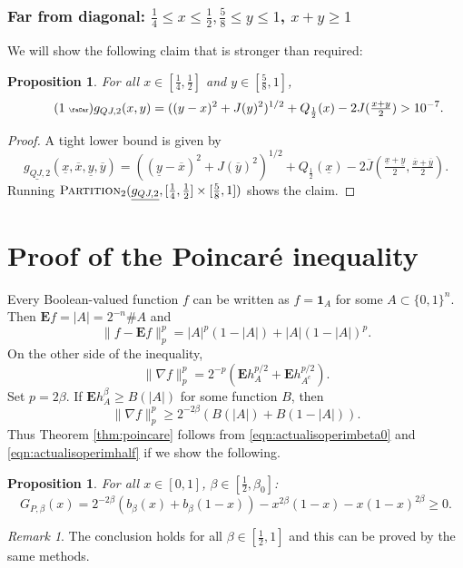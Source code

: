 \documentclass[12pt]{amsart}
\theoremstyle{plain}
\newtheorem{prop}[thm]{Proposition}
\newcommand{\auto}{\tag{\addtocounter{equation}{1}\theequation\;{\tiny\faCar}}}
\theoremstyle{definition}
\theoremstyle{remark}
\newtheorem{rem}[thm]{Remark}
\numberwithin{equation}{section}
\begin{document}
\subsubsection{Far from diagonal: $\tfrac14\leq x\leq \tfrac12, \frac58\leq y\le 1$, $x+y\ge 1$}
\label{sec:QJ-II}
We will show the following claim that is stronger than required:
\begin{prop}
For all $x\in [\frac14, \frac12]$ and $y\in[\frac58,1]$,
\begin{equation}\label{eqn:g_QJ_2_auto}\auto
g_{QJ,2}(x,y)= ((y-x)^2 +J(y)^2)^{1/2}+Q_{\frac12}(x)-2J(\tfrac{x+y}{2})>10^{-7}.
\end{equation}
\end{prop}

\begin{proof}
A tight lower bound is given by
\[ \underline{g_{QJ,2}}(\underline{x},\overline{x},\underline{y},\overline{y}) = ((\underline{y}-\overline{x})^2 + J(\overline{y})^2)^{1/2} + Q_{\frac12}(\underline{x})-2\overline{J}(\tfrac{\underline{x}+\underline{y}}{2},\tfrac{\overline{x}+\overline{y}}{2}). \]
Running $\textsc{Partition}_2(\underline{g_{QJ,2}},[\tfrac14,\tfrac12]\times [\tfrac58,1])$ shows the claim.
\end{proof}

\section{Proof of the Poincar\'e inequality}\label{sec:poincare}

Every Boolean-valued function $f$ can be written as $f=\mathbf{1}_A$ for some $A\subset \{0,1\}^n$.
Then $\mathbf{E} f=|A|=2^{-n}\#A$ and
\[ \|f-\mathbf{E} f\|^p_p = |A|^{p} (1-|A|) + |A| (1-|A|)^{p}. \]
On the other side of the inequality, 
\begin{equation}\label{eqn:twosidedgradient}
\|\nabla f\|_p^p = 2^{-p} ( \mathbf{E} h_A^{p/2} + \mathbf{E} h_{A^c}^{p/2}).  
\end{equation}
Set $p=2\beta$.
If $\mathbf{E}h_A^{\beta}\ge B(|A|)$ for some function $B$, then
\[\|\nabla f\|_p^p \geq 2^{-2\beta}(B(|A|)+B(1-|A|)).\]
Thus Theorem \ref{thm:poincare} follows from \eqref{eqn:actualisoperimbeta0} and \eqref{eqn:actualisoperimhalf} if we show the following.

\begin{prop}\label{prop:poincarepenult}
For all $x\in [0,1]$, $\beta\in [\frac12,\beta_0]$:
\[ G_{P,\beta}(x)= 2^{-2\beta}( b_\beta(x) + b_\beta(1-x)) - x^{2\beta}(1-x) - x(1-x)^{2\beta} \ge 0. \]
\end{prop}
\begin{rem}
The conclusion holds for all $\beta\in[\tfrac12,1]$ and this can be proved by the same methods.
\end{rem}
\end{document}
